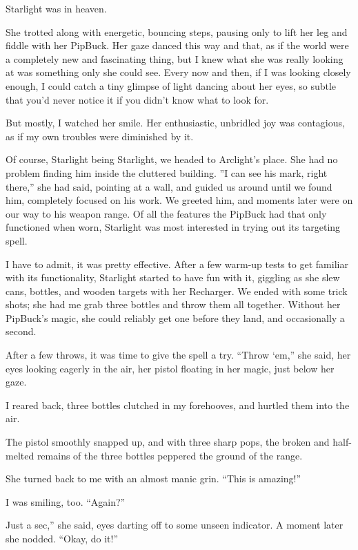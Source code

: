{\br}%
Starlight was in heaven.

She trotted along with energetic, bouncing steps, pausing only to lift her leg and fiddle with her PipBuck. Her gaze danced this way and that, as if the world were a completely new and fascinating thing, but I knew what she was really looking at was something only she could see. Every now and then, if I was looking closely enough, I could catch a tiny glimpse of light dancing about her eyes, so subtle that you’d never notice it if you didn’t know what to look for.

But mostly, I watched her smile. Her enthusiastic, unbridled joy was contagious, as if my own troubles were diminished by it.

Of course, Starlight being Starlight, we headed to Arclight’s place. She had no problem finding him inside the cluttered building. ”I can see his mark, right there,” she had said, pointing at a wall, and guided us around until we found him, completely focused on his work. We greeted him, and moments later were on our way to his weapon range. Of all the features the PipBuck had that only functioned when worn, Starlight was most interested in trying out its targeting spell.

I have to admit, it was pretty effective. After a few warm-up tests to get familiar with its functionality, Starlight started to have fun with it, giggling as she slew cans, bottles, and wooden targets with her Recharger. We ended with some trick shots; she had me grab three bottles and throw them all together. Without her PipBuck’s magic, she could reliably get one before they land, and occasionally a second.

After a few throws, it was time to give the spell a try. “Throw ‘em,” she said, her eyes looking eagerly in the air, her pistol floating in her magic, just below her gaze.

I reared back, three bottles clutched in my forehooves, and hurtled them into the air.

The pistol smoothly snapped up, and with three sharp pops, the broken and half-melted remains of the three bottles peppered the ground of the range.

She turned back to me with an almost manic grin. “This is amazing!”

I was smiling, too. “Again?”

\leavevmode{}Just a sec,” she said, eyes darting off to some unseen indicator. A moment later she nodded. “Okay, do it!”

